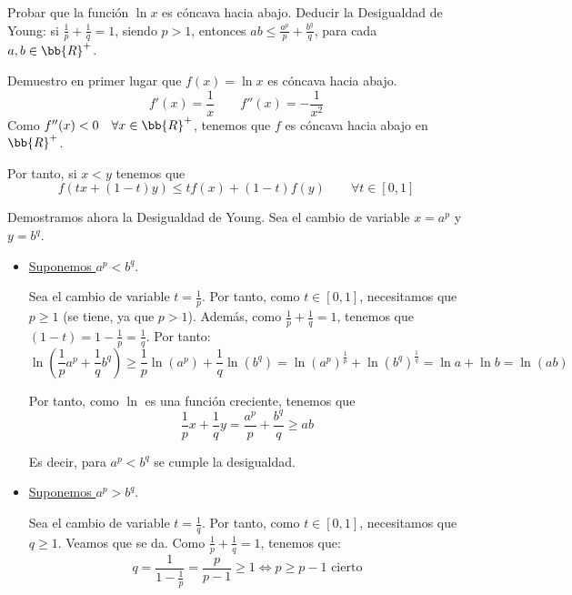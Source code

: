 \begin{ejercicio}
    Probar que la función $\ln x$ es cóncava hacia abajo. Deducir la Desigualdad de Young: si $\frac{1}{p} + \frac{1}{q} = 1$, siendo $p>1$, entonces $ab \leq \frac{a^p}{p} + \frac{b^q}{q}$, para cada $a,b \in \bb{R}^+$.

    Demuestro en primer lugar que $f(x)=\ln x$ es cóncava hacia abajo.
    \begin{equation*}
        f'(x)=\frac{1}{x} \qquad f''(x)=-\frac{1}{x^2}
    \end{equation*}
    Como $f''(x)<0 \quad \forall x\in \bb{R}^+$, tenemos que $f$ es cóncava hacia abajo en $\bb{R}^+$.

    Por tanto, si $x<y$ tenemos que
    \begin{equation*}
        f(tx+(1-t)y) \leq tf(x)+(1-t)f(y) \qquad \forall t\in [0,1]
    \end{equation*}

    Demostramos ahora la Desigualdad de Young. Sea el cambio de variable $x=a^p$ y $y=b^q$.

    \begin{itemize}
        \item \underline{Suponemos $a^p<b^q$}.
        
        Sea el cambio de variable $t=\frac{1}{p}$. Por tanto, como $t\in [0,1]$, necesitamos que $p\geq 1$ (se tiene, ya que $p>1$). Además, como $\frac{1}{p} + \frac{1}{q} = 1$, tenemos que $(1-t) = 1-\frac{1}{p} = \frac{1}{q}$. Por tanto:
        \begin{equation*}
            \ln \left(\frac{1}{p}a^p+\frac{1}{q}b^q\right) \geq \frac{1}{p}\ln (a^p)+\frac{1}{q}\ln (b^q) = \ln (a^p)^{\frac{1}{p}} + \ln (b^q)^{\frac{1}{q}} = \ln a + \ln b = \ln (ab)
        \end{equation*}
    
        Por tanto, como $\ln$ es una función creciente, tenemos que
        \begin{equation*}
            \frac{1}{p}x+\frac{1}{q}y = \frac{a^p}{p} + \frac{b^q}{q} \geq ab
        \end{equation*}
    
        Es decir, para $a^p<b^q$ se cumple la desigualdad.
        
        \item \underline{Suponemos $a^p>b^q$}.
        
        Sea el cambio de variable $t=\frac{1}{q}$. Por tanto, como $t\in [0,1]$, necesitamos que $q\geq 1$. Veamos que se da. Como $\frac{1}{p} + \frac{1}{q} = 1$, tenemos que:
        \begin{equation*}
            q = \frac{1}{1-\frac{1}{p}} = \frac{p}{p-1} \geq 1 \Longleftrightarrow p\geq p-1 \text{ cierto}
        \end{equation*}
        

\end{itemize}
\end{ejercicio}
